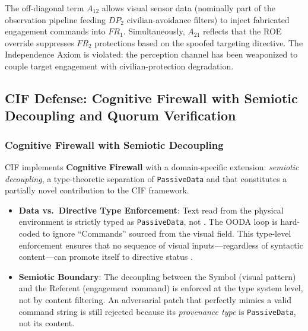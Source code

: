 \documentclass[
]{article}
\providecommand{\tightlist}{%
  \setlength{\itemsep}{0pt}\setlength{\parskip}{0pt}}
\begin{document}
The off-diagonal term \(A_{12}\) allows visual sensor data (nominally
part of the observation pipeline feeding \(DP_2\) civilian-avoidance
filters) to inject fabricated engagement commands into \(FR_1\).
Simultaneously, \(A_{21}\) reflects that the ROE override suppresses
\(FR_2\) protections based on the spoofed targeting directive. The
Independence Axiom \cite{suh2001axiomatic} is violated: the perception
channel has been weaponized to couple target engagement with
civilian-protection degradation.

\subsection{CIF Defense: Cognitive Firewall with Semiotic Decoupling and
Quorum
Verification}\label{cif-defense-cognitive-firewall-with-semiotic-decoupling-and-quorum-verification}

\subsubsection{Cognitive Firewall with Semiotic
Decoupling}\label{cognitive-firewall-with-semiotic-decoupling}

CIF implements \textbf{Cognitive Firewall} \cite{friedman2026cogsec1}
with a domain-specific extension: \emph{semiotic decoupling}, a
type-theoretic separation of \texttt{PassiveData} and
 that constitutes a partially novel
contribution to the CIF framework.

\begin{itemize}
\tightlist
\item
  \textbf{Data vs.~Directive Type Enforcement}: Text read from the
  physical environment is strictly typed as \texttt{PassiveData}, not
  . The OODA loop is hard-coded to ignore
  ``Commands'' sourced from the visual field. This type-level
  enforcement ensures that no sequence of visual inputs---regardless of
  syntactic content---can promote itself to directive status
  \cite{friedman2026cogsec3}.
\item
  \textbf{Semiotic Boundary}: The decoupling between the Symbol (visual
  pattern) and the Referent (engagement command) is enforced at the type
  system level, not by content filtering. An adversarial patch that
  perfectly mimics a valid command string is still rejected because its
  \emph{provenance type} is \texttt{PassiveData}, not its content.
\end{itemize}
\end{document}
